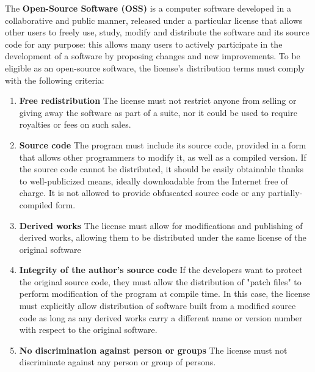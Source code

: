 The \textbf{Open-Source Software (OSS)} is a computer software developed in a collaborative and public manner, released under a particular license that allows other users to freely use, study, modify and distribute the software and its source code for any purpose: this allows many users to actively participate in the development of a software by proposing changes and new improvements.
\newline \newline
To be eligible as an open-source software, the license's distribution terms must comply with the following criteria: \cite{osd}
\begin{enumerate}
    
    \item \textbf{Free redistribution} \newline 
    The license must not restrict anyone from selling or giving away the software as part of a suite, nor it could be used to require royalties or fees on such sales.
    
    \item \textbf{Source code} \newline
    The program must include its source code, provided in a form that allows other programmers to modify it, as well as a compiled version. If the source code cannot be distributed, it should be easily obtainable thanks to well-publicized means, ideally downloadable from the Internet free of charge.
    It is not allowed to provide obfuscated source code or any partially-compiled form.
    
    \item \textbf{Derived works} \newline
    The license must allow for modifications and publishing of derived works, allowing them to be distributed under the same license of the original software
    
    \item \textbf{Integrity of the author's source code} \newline
    If the developers want to protect the original source code, they must allow the distribution of "patch files" to perform modification of the program at compile time. In this case, the license must explicitly allow distribution of software built from a modified source code as long as any derived works carry a different name or version number with respect to the original software. 
    
    \item \textbf{No discrimination against person or groups} \newline
    The license must not discriminate against any person or group of persons.
    

\end{enumerate}
